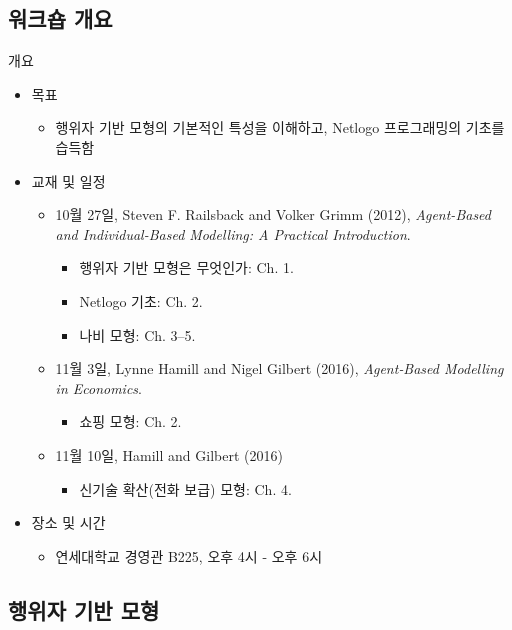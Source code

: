 \documentclass[hyperref={unicode}]{beamer}
\begin{document}
\subsection*{워크숍 개요}
\begin{frame}{개요}
\begin{itemize}
\item 목표
	\begin{itemize}
	\item 행위자 기반 모형의 기본적인 특성을 이해하고, Netlogo 프로그래밍의 기초를 습득함
	\end{itemize}
\item 교재 및 일정
	\begin{itemize}
	\item 10월 27일, Steven F. Railsback and Volker Grimm (2012), \textit{
		Agent-Based and Individual-Based Modelling: A Practical Introduction}.
		\begin{itemize}
		\item 행위자 기반 모형은 무엇인가: Ch. 1.
		\item Netlogo 기초: Ch. 2.
		\item 나비 모형: Ch. 3--5.
		\end{itemize}
	\item 11월 3일, Lynne Hamill and Nigel Gilbert (2016), \textit{Agent‐Based Modelling in Economics}.
		\begin{itemize}
		\item 쇼핑 모형: Ch. 2.
		\end{itemize}
	\item 11월 10일, Hamill and Gilbert (2016)
		\begin{itemize}
		\item 신기술 확산(전화 보급) 모형: Ch. 4.
		\end{itemize}
	\end{itemize}
\item 장소 및 시간
	\begin{itemize}
	\item 연세대학교 경영관 B225, 오후 4시 - 오후 6시
	\end{itemize}	
\end{itemize}	
\end{frame}

\subsection*{행위자 기반 모형}
\end{document}
